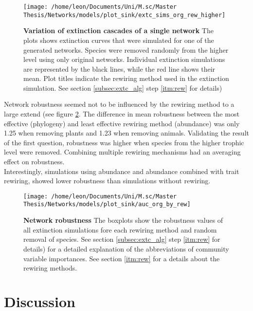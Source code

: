 \documentclass[12pt,a4paper]{article}
\begin{document}
\begin{figure}[H]
	 \texttt{[image: /home/leon/Documents/Uni/M.sc/Master Thesis/Networks/models/plot\_sink/extc\_sims\_org\_rew\_higher]}
	 \caption{\textbf{Variation of extinction cascades of a single network} The plots shows extinction curves that were simulated for one of the generated networks. Species were removed randomly from the higher level using only original networks. Individual extinction simulations are represented by the black lines, while the red line shows their mean. Plot titles indicate the rewiring method used in the extinction simulation. See section \ref{subsec:extc_alg} step \ref{itm:rew} for details)}
	 \label{fig:extc_org_rew_higher}
\end{figure}

Network robustness seemed not to be influenced by the rewiring method to a large extend (see figure \ref{fig:auc_org_rew}. The difference in mean robustness between the most effective (phylogeny) and least effective rewiring method (abundance) was only 1.25 when removing plants and 1.23 when removing animals. Validating the result of the first question, robustness was higher when species from the higher trophic level were removed. Combining multiple rewiring mechanisms had an averaging effect on robustness. \\

Interestingly, simulations using abundance and abundance combined with trait rewiring, showed lower robustness than simulations without rewiring.
\begin{figure}[H]
	 \texttt{[image: /home/leon/Documents/Uni/M.sc/Master Thesis/Networks/models/plot\_sink/auc\_org\_by\_rew]}
	 \caption{\textbf{Network robustness } The boxplots show the robustness values of all extinction simulations fore each rewiring method and random removal of species. See section \ref{subsec:extc_alg} step \ref{itm:rew} for details) for a detailed explanation of the abbreviations of community variable importances. See section \ref{itm:rew} for a details about the rewiring methods.}
	 \label{fig:auc_org_rew}
\end{figure}

\newpage
	\section{Discussion}
\end{document}
